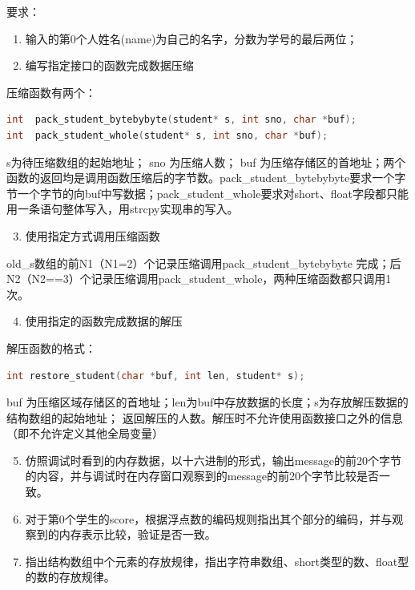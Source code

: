 \documentclass[supercite]{Experimental_Report}
\theoremstyle{definition}
\begin{document}
要求：
\begin{enumerate}
  \item 输入的第0个人姓名(name)为自己的名字，分数为学号的最后两位；
  \item 编写指定接口的函数完成数据压缩
\end{enumerate}

压缩函数有两个：

\begin{lstlisting}[language=C]
int  pack_student_bytebybyte(student* s, int sno, char *buf);
int  pack_student_whole(student* s, int sno, char *buf);
\end{lstlisting}

s为待压缩数组的起始地址； sno 为压缩人数； buf 为压缩存储区的首地址；两个函数的返回均是调用函数压缩后的字节数。pack\_student\_bytebybyte要求一个字节一个字节的向buf中写数据；pack\_student\_whole要求对short、float字段都只能用一条语句整体写入，用strcpy实现串的写入。

\begin{enumerate}
  \setcounter{enumi}{2}
  \item 使用指定方式调用压缩函数
\end{enumerate}

old\_s数组的前N1（N1=2）个记录压缩调用pack\_student\_bytebybyte 完成；后N2（N2==3）个记录压缩调用pack\_student\_whole，两种压缩函数都只调用1次。

\begin{enumerate}
  \setcounter{enumi}{3}
  \item 使用指定的函数完成数据的解压
\end{enumerate}

解压函数的格式：

\begin{lstlisting}[language=C]
int restore_student(char *buf, int len, student* s);
\end{lstlisting}

buf 为压缩区域存储区的首地址；len为buf中存放数据的长度；s为存放解压数据的结构数组的起始地址； 返回解压的人数。解压时不允许使用函数接口之外的信息（即不允许定义其他全局变量）

\begin{enumerate}
  \setcounter{enumi}{4}
  \item 仿照调试时看到的内存数据，以十六进制的形式，输出message的前20个字节的内容，并与调试时在内存窗口观察到的message的前20个字节比较是否一致。
  \item 对于第0个学生的score，根据浮点数的编码规则指出其个部分的编码，并与观察到的内存表示比较，验证是否一致。
  \item 指出结构数组中个元素的存放规律，指出字符串数组、short类型的数、float型的数的存放规律。
\end{enumerate}
\end{document}
